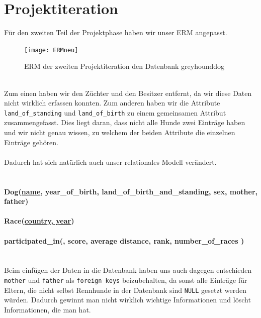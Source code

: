 \documentclass[10pt,a4paper]{article}
\begin{document}
\section{Projektiteration}
	Für den zweiten Teil der Projektphase haben wir unser ERM angepasst.
	\begin{figure}[h]
		\centering
		\texttt{[image: ERMneu]}
		\caption{ERM der zweiten Projektiteration den Datenbank greyhounddog}
		\label{fig:ERMneu}
	\end{figure} 
	\\
	Zum einen haben wir den Züchter und den Besitzer entfernt, da wir diese Daten nicht wirklich erfassen konnten. Zum anderen haben wir die Attribute \texttt{land\_of\_standing} und \texttt{land\_of\_birth} zu einem gemeinsamen Attribut zusammengefasst. Dies liegt daran, dass nicht alle Hunde zwei Einträge haben und wir nicht genau wissen, zu welchem der beiden Attribute die einzelnen Einträge gehören.\\ 
	\\
	Dadurch hat sich natürlich auch unser relationales Modell verändert.\\
	\\
	\\\textsf{
		\textbf{Dog(\underline{name}, year\_of\_birth, land\_of\_birth\_and\_standing, sex, mother, father)
		\\ \\
		Race(\underline{country, year})
		\\ \\
		participated\_in(, score, average distance,  rank, number\_of\_races )}}
	\\ \\ \\
	Beim einfügen der Daten in die Datenbank haben uns auch dagegen entschieden \texttt{mother} und \texttt{father} als \texttt{foreign keys} beizubehalten, da sonst alle Einträge für Eltern, die nicht selbst Rennhunde in der Datenbank sind \texttt{NULL} gesetzt werden würden. Dadurch gewinnt man nicht wirklich wichtige Informationen und löscht Informationen, die man hat.
\end{document}
